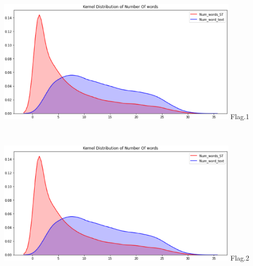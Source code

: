 \documentclass{tikzposter} %
\begin{document}
\begin{columns}
{\begin{description}
    \begin{center}
      \begin{minipage}{0.5\linewidth}
      \centering
      \includegraphics[width=0.9\textwidth]{kaggle/1.1.eps}
      {\small{Flag.1}}
      \end{minipage}
      \hfill
      \\
    \end{center}
    \begin{center}
      \begin{minipage}{0.5\linewidth}
      \centering
      \includegraphics[width=0.9\textwidth]{kaggle/1.2.eps}
      {\small{Flag.2}}
      \end{minipage}
      \hfill
      \\
    \end{center}
  \end{description}
 
  	
		
}




\end{columns}
\end{document}
